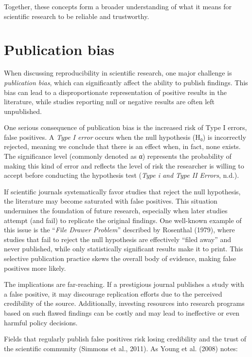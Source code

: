 \documentclass[
  a4paper,
]{article}
\begin{document}
Together, these concepts form a broader understanding of what it means
for scientific research to be reliable and trustworthy.

\section{Publication bias}\label{publication-bias}

When discussing reproducibility in scientific research, one major
challenge is \emph{publication bias}, which can significantly affect the
ability to publish findings. This bias can lead to a disproportionate
representation of positive results in the literature, while studies
reporting null or negative results are often left unpublished.

One serious consequence of publication bias is the increased risk of
Type I errors, false positives. A \emph{Type I error} occurs when the
null hypothesis (H₀) is incorrectly rejected, meaning we conclude that
there is an effect when, in fact, none exists. The significance level
(commonly denoted as α) represents the probability of making this kind
of error and reflects the level of risk the researcher is willing to
accept before conducting the hypothesis test (\emph{Type i and Type II
Errors}, n.d.).

If scientific journals systematically favor studies that reject the null
hypothesis, the literature may become saturated with false positives.
This situation undermines the foundation of future research, especially
when later studies attempt (and fail) to replicate the original
findings. One well-known example of this issue is the ``\emph{File
Drawer Problem}'' described by Rosenthal (1979), where studies that fail
to reject the null hypothesis are effectively ``filed away'' and never
published, while only statistically significant results make it to
print. This selective publication practice skews the overall body of
evidence, making false positives more likely.

The implications are far-reaching. If a prestigious journal publishes a
study with a false positive, it may discourage replication efforts due
to the perceived credibility of the source. Additionally, investing
resources into research programs based on such flawed findings can be
costly and may lead to ineffective or even harmful policy decisions.

Fields that regularly publish false positives risk losing credibility
and the trust of the scientific community (Simmons et al., 2011). As
Young et al. (2008) notes:
\end{document}
